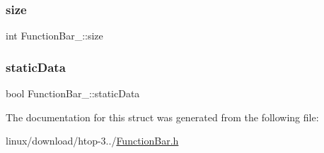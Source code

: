 \subsubsection{\texorpdfstring{size}{size}}
{\footnotesize\ttfamily int Function\+Bar\+\_\+\+::size}

\mbox{\label{structFunctionBar___aa5e10740801f6fa922ba70314f65cf5c}} 
\subsubsection{\texorpdfstring{static\+Data}{staticData}}
{\footnotesize\ttfamily bool Function\+Bar\+\_\+\+::static\+Data}



The documentation for this struct was generated from the following file\+:\begin{DoxyCompactItemize}
\item 
linux/download/htop-\/3../\hyperlink{FunctionBar_8h}{Function\+Bar.\+h}\end{DoxyCompactItemize}
